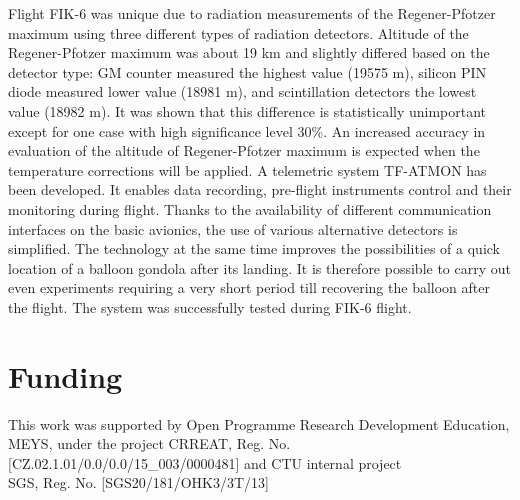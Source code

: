 \documentclass{Rpd}
\begin{document}
Flight FIK-6 was unique due to radiation measurements of the Regener-Pfotzer maximum using three different types of radiation detectors. Altitude of the Regener-Pfotzer maximum was about 19 km and slightly differed based on the detector type: GM counter measured the highest value (19575 m), silicon PIN diode measured lower value (18981 m), and scintillation detectors the lowest value (18982 m). It was shown that this difference is statistically unimportant except for one case with high significance level 30\%. An increased accuracy in evaluation of the altitude of Regener-Pfotzer maximum is expected when the temperature corrections will be applied.
A telemetric system TF-ATMON has been developed. It enables data recording, pre-flight instruments control and their monitoring during flight. Thanks to the availability of different communication interfaces on the basic avionics, the use of various alternative detectors is simplified. The technology at the same time improves the possibilities of a quick location of a balloon gondola after its landing. It is therefore possible to carry out even experiments requiring a very short period till recovering the balloon after the flight. The system was successfully tested during FIK-6 flight.

\section*{Funding}

This work was supported by Open Programme Research Development Education, MEYS, under the project CRREAT, \newline Reg. No. [CZ.02.1.01/0.0/0.0/15\_003/0000481] and CTU internal project \\ SGS, Reg. No. [SGS20/181/OHK3/3T/13]
\end{document}
